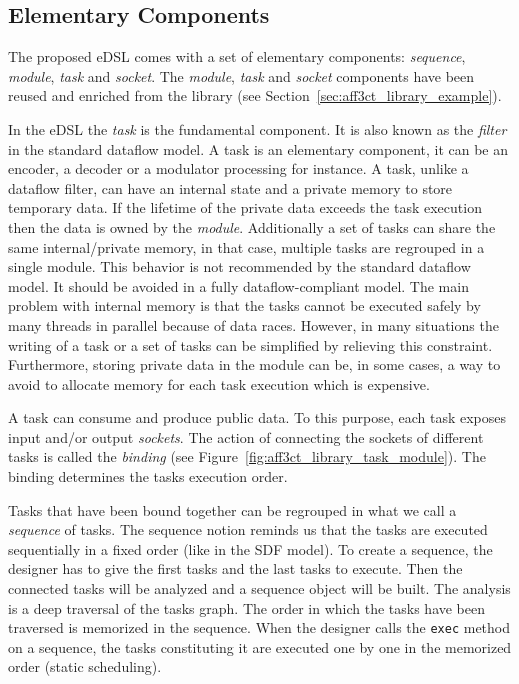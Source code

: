 \subsection{Elementary Components}

The proposed eDSL comes with a set of elementary components: \emph{sequence},
\emph{module}, \emph{task} and \emph{socket}. The \emph{module}, \emph{task} and
\emph{socket} components have been reused and enriched from the \AFFECT library
(see Section~\ref{sec:aff3ct_library_example}).

In the eDSL the \emph{task} is the fundamental component. It is also known as
the \emph{filter} in the standard dataflow model. A task is an elementary
component, it can be an encoder, a decoder or a modulator processing for
instance. A task, unlike a dataflow filter, can have an internal state and a
private memory to store temporary data. If the lifetime of the private data
exceeds the task execution then the data is owned by the \emph{module}.
Additionally a set of tasks can share the same internal/private memory, in that
case, multiple tasks are regrouped in a single module. This behavior is not
recommended by the standard dataflow model. It should be avoided in a fully
dataflow-compliant model. The main problem with internal memory is that the
tasks cannot be executed safely by many threads in parallel because of data
races. However, in many situations the writing of a task or a set of tasks can
be simplified by relieving this constraint. Furthermore, storing private data in
the module can be, in some cases, a way to avoid to allocate memory for each
task execution which is expensive.

A task can consume and produce public data. To this purpose, each task exposes
input and/or output \emph{sockets}. The action of connecting the sockets of
different tasks is called the \emph{binding} (see
Figure~\ref{fig:aff3ct_library_task_module}). The binding determines the tasks
execution order.

Tasks that have been bound together can be regrouped in what we call a
\emph{sequence} of tasks. The sequence notion reminds us that the tasks are
executed sequentially in a fixed order (like in the SDF model). To create a
sequence, the designer has to give the first tasks and the last tasks to
execute. Then the connected tasks will be analyzed and a sequence object will be
built. The analysis is a deep traversal of the tasks graph. The order in which
the tasks have been traversed is memorized in the sequence. When the designer
calls the \verb|exec| method on a sequence, the tasks constituting it are
executed one by one in the memorized order (static scheduling).

